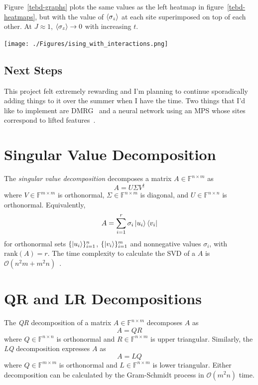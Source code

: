 \documentclass[12pt]{article}
\newenvironment{Figure}
  {\par\medskip\noindent\minipage{\linewidth}}
  {\endminipage\par\medskip}
\begin{document}
\begin{multicols}{2}
	Figure~\ref{tebd-graphs} plots the same values as the left heatmap in figure~\ref{tebd-heatmaps}, but with the value of $\braket{\sigma_z}$ at each site superimposed on top of each other. At $J\approx1$, $\braket{\sigma_z}\rightarrow 0$ with increasing $t$.



	\begin{Figure}
		\center\texttt{[image: ./Figures/ising\_with\_interactions.png]}
		\label{tebd-graphs}
	\end{Figure}



	\subsection{Next Steps}
	This project felt extremely rewarding and I'm planning to continue
	sporadically adding things to it over the summer when I have the
	time. Two things that I'd like to implement are DMRG~\cite{DMRG}
	and a neural network using an MPS whose sites correspond to lifted
	features~\cite{mps-ml, Huggins}.





\appendix
\section{Singular Value Decomposition}
The \textit{singular value decomposition} decomposes a matrix $A\in\mathds{F}^{n\times m}$ as
\[
	A=U\Sigma V^\dagger
\]
where $V\in \mathds{F}^{m\times m}$ is orthonormal, $\Sigma\in\mathds{F}^{n\times m}$ is diagonal, and $U\in\mathds{F}^{n\times n}$ is orthonormal. Equivalently,
\[
	A=\sum_{i=1}^r\sigma_i\ket{u_i}\bra{v_i}
\]
for orthonormal sets $\{\ket{u_i}\}_{i=1}^n$, $\{\ket{v_i}\}_{i=1}^m$ and nonnegative values $\sigma_i$, with $\text{rank}(A)=r$. The time complexity to calculate the SVD of a $A$ is $\mathcal{O}(n^2m+m^2n)$~\cite{matrix-stuff}.
\section{QR and LR Decompositions}
The \textit{QR} decomposition of a matrix $A\in\mathds{F}^{n\times m}$ decomposes $A$ as
\[
	A=QR
\]
where $Q\in\mathds{F}^{n\times n}$ is orthonormal and $R\in\mathds{F}^{n\times m}$ is upper triangular. Similarly, the \textit{LQ} decomposition expresses $A$ as
\[
	A=LQ
\]
where $Q\in\mathds{F}^{m\times m}$ is orthonormal and $L\in\mathds{F}^{n\times m}$ is lower triangular.
Either decomposition can be calculated by the Gram-Schmidt process in $\mathcal{O}(m^2n)$ time.
\end{multicols}
\end{document}
